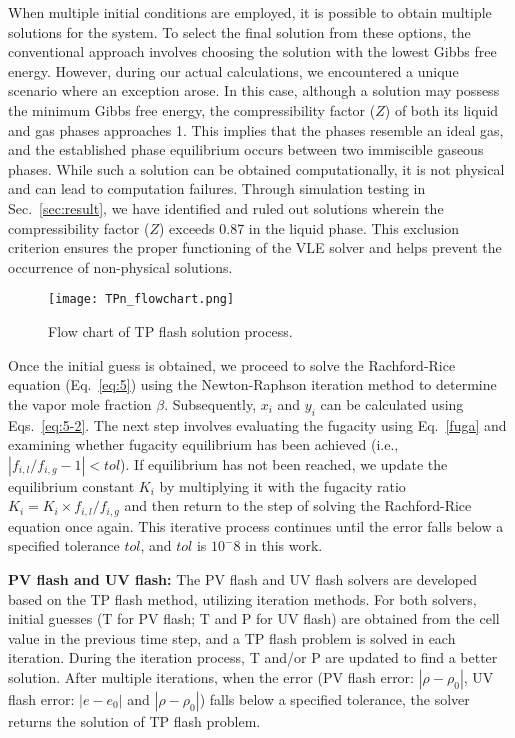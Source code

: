 When multiple initial conditions are employed, it is possible to obtain multiple solutions for the system. To select the final solution from these options, the conventional approach involves choosing the solution with the lowest Gibbs free energy. However, during our actual calculations, we encountered a unique scenario where an exception arose. In this case, although a solution may possess the minimum Gibbs free energy, the compressibility factor ($Z$) of both its liquid and gas phases approaches 1. This implies that the phases resemble an ideal gas, and the established phase equilibrium occurs between two immiscible gaseous phases. While such a solution can be obtained computationally, it is not physical and can lead to computation failures. Through simulation testing in Sec.~\ref{sec:result}, we have identified and ruled out solutions wherein the compressibility factor ($Z$) exceeds 0.87 in the liquid phase. This exclusion criterion ensures the proper functioning of the VLE solver and helps prevent the occurrence of non-physical solutions.

\begin{figure}[htbp]
\centering
\texttt{[image: TPn\_flowchart.png]}
\caption{Flow chart of TP flash solution process.}
\label{FC} 
\end{figure}

Once the initial guess is obtained, we proceed to solve the Rachford-Rice equation (Eq.~\ref{eq:5}) using the Newton-Raphson iteration method to determine the vapor mole fraction $\beta$. Subsequently, $x_i$ and $y_i$ can be calculated using Eqs.~\ref{eq:5-2}. The next step involves evaluating the fugacity using Eq.~\ref{fuga} and examining whether fugacity equilibrium has been achieved (i.e., $\left|f_{i,l}/f_{i,g}-1\right| < tol $). If equilibrium has not been reached, we update the equilibrium constant $K_i$ by multiplying it with the fugacity ratio $K_i=K_i \times f_{i,l}/f_{i,g}$ and then return to the step of solving the Rachford-Rice equation once again. This iterative process continues until the error falls below a specified tolerance $tol$, and $tol$ is $10^-8$ in this work. 


\textbf{PV flash and UV flash:}
The PV flash and UV flash solvers are developed based on the TP flash method, utilizing iteration methods. For both solvers, initial guesses (T for PV flash; T and P for UV flash) are obtained from the cell value in the previous time step, and a TP flash problem is solved in each iteration. During the iteration process, T and/or P are updated to find a better solution. After multiple iterations, when the error (PV flash error: $|\rho - \rho_0|$, UV flash error: $|e - e_0|$ and $|\rho - \rho_0|$) falls below a specified tolerance, the solver returns the solution of TP flash problem.


